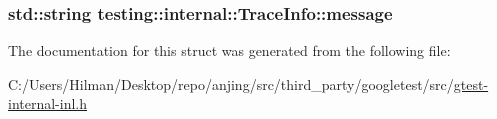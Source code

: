 \subsubsection[{message}]{\setlength{\rightskip}{0pt plus 5cm}std\+::string testing\+::internal\+::\+Trace\+Info\+::message}\label{structtesting_1_1internal_1_1_trace_info_a39e74f39ce6d5fdbac799abdb1c27f90}


The documentation for this struct was generated from the following file\+:\begin{DoxyCompactItemize}
\item 
C\+:/\+Users/\+Hilman/\+Desktop/repo/anjing/src/third\+\_\+party/googletest/src/\hyperlink{gtest-internal-inl_8h}{gtest-\/internal-\/inl.\+h}\end{DoxyCompactItemize}
